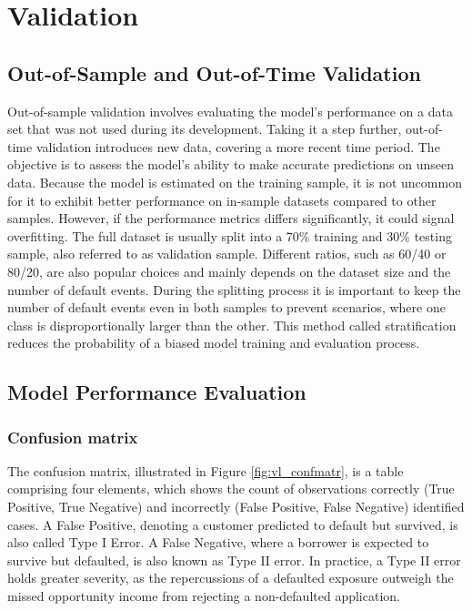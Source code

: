 \chapter{Validation}

\section{Out-of-Sample and Out-of-Time Validation}
Out-of-sample validation involves evaluating the model's performance on a data set that was not used during its development. Taking it a step further, out-of-time validation introduces new data, covering a more recent time period. The objective is to assess the model's ability to make accurate predictions on unseen data. Because the model is estimated on the training sample, it is not uncommon for it to exhibit better performance on in-sample datasets compared to other samples. However, if the performance metrics differs significantly, it could signal overfitting. The full dataset is usually split into a 70\% training and 30\% testing sample, also referred to as validation sample. Different ratios, such as 60/40 or 80/20, are also popular choices and mainly depends on the dataset size and the number of default events. During the splitting process it is important to keep the number of default events even in both samples to prevent scenarios, where one class is disproportionally larger than the other. This method called stratification reduces the probability of a biased model training and evaluation process. \cite[p.~27]{Witzany:2017}

\section{Model Performance Evaluation}

\subsection{Confusion matrix}
The confusion matrix, illustrated in Figure \ref{fig:vl_confmatr}, is a table comprising four elements, which shows the count of observations correctly (True Positive, True Negative) and incorrectly (False Positive, False Negative) identified cases. A False Positive, denoting a customer predicted to default but survived, is also called Type I Error. A False Negative, where a borrower is expected to survive but defaulted, is also known as Type II error. In practice, a Type II error holds greater severity, as the repercussions of a defaulted exposure outweigh the missed opportunity income from rejecting a non-defaulted application. \cite[p.~29.30]{Witzany:2017}

